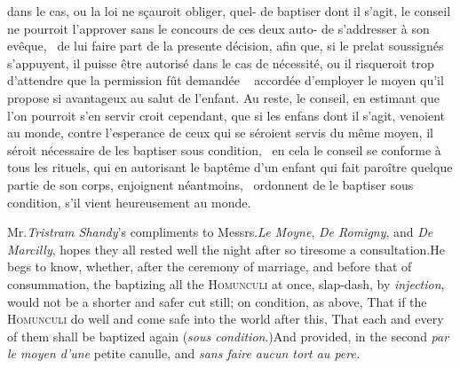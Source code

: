 \documentclass{article}
\begin{document}
dans le cas, ou la loi ne sçauroit obliger, quel-\break
{}\break
de baptiser dont il s’agit, le conseil ne pourroit\break
l’approver sans le concours de ces deux auto-\break
{}\break
de s’addresser à son evêque, \et\  de lui faire part\break
de la presente décision, afin que, si le prelat\break
{}\break
soussignés s’appuyent, il puisse être autorisé\break
dans le cas de nécessité, ou il risqueroit trop\break
d'attendre que la permission fût demandée \et\ \break
accordée d’employer le moyen qu’il propose si\break
avantageux au salut de l’enfant. Au reste,\break
le conseil, en estimant que l’on pourroit s’en\break
servir croit cependant, que si les enfans dont\break
il s’agit, venoient au monde, contre l’esperance
de ceux qui se séroient servis du même moyen, il séroit nécessaire de
les baptiser \textnormal{sous cond\-ition,} \et\  en cela le conseil se conforme à
tous les rituels, qui en autorisant le baptême d’un enfant qui fait paroître quelque
partie de son corps, enjoignent néantmoins, \et\  ordonnent de le baptiser
\textnormal{sous condition}, s’il vient heu\-reusement au monde.  
\egroup 

\noindent
{}

\bigskip

\vbox{}

\bigskip

Mr.\@ \textit{Tristram Shandy}’s compliments to Messrs.\@ \textit{Le
Moyne}, \textit{De Romigny}, and \textit{De Marcilly}, hopes they all
rested well the night after so tiresome a consultation.\tsk\break  He
begs to know, whether, after the ce\-remony of marriage, and before
that of consummation, the baptizing all the
\textsc{Homunculi} at once, slap-dash, by \textit{injection},
would not be a shorter and safer cut still; on condition, as above,
That if the \textsc{Homunculi} do well and come safe into
the world after this, That each and every of them shall be baptized
again (\textit{sous condition}.)\tsh  And provided, in the
second\break
{}
\textit{par le moyen d’une} petite canulle, and\break 
\textit{sans faire aucun tort au pere.}

\null
\end{document}
